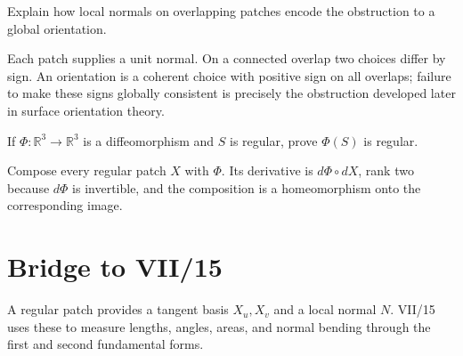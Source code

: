 \begin{problem}\label{prob:vii14-ch04}
Explain how local normals on overlapping patches encode the obstruction to a global orientation.
\end{problem}
\begin{solution}
Each patch supplies a unit normal. On a connected overlap two choices differ by sign. An orientation is a coherent choice with positive sign on all overlaps; failure to make these signs globally consistent is precisely the obstruction developed later in surface orientation theory.
\end{solution}

\begin{problem}\label{prob:vii14-ch05}
If \(\Phi:\mathbb R^3\to\mathbb R^3\) is a diffeomorphism and \(S\) is regular, prove \(\Phi(S)\) is regular.
\end{problem}
\begin{solution}
Compose every regular patch \(X\) with \(\Phi\). Its derivative is \(d\Phi\circ dX\), rank two because \(d\Phi\) is invertible, and the composition is a homeomorphism onto the corresponding image.
\end{solution}

\section*{Bridge to VII/15}
A regular patch provides a tangent basis \(X_u,X_v\) and a local normal \(N\).  VII/15 uses these to measure lengths, angles, areas, and normal bending through the first and second fundamental forms.
